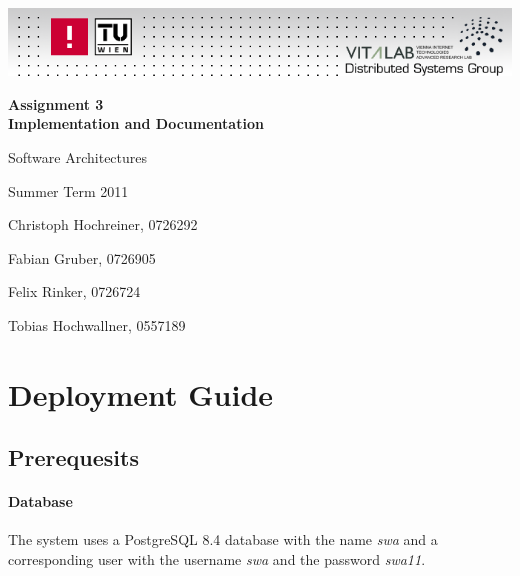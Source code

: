 \documentclass[a4paper]{article}
\begin{document}
\pagestyle{fancy}
\fancyfoot{}
\fancyhead{}
\fancyfoot[C]{\thepage}
\renewcommand{\headrulewidth}{0.0pt}

\begin{center}
\includegraphics[width=1.0\textwidth]{logo.png}

\vspace{3cm}

\huge \textsf{\textbf{Assignment 3\\Implementation and Documentation}}

\vspace{1ex}

\Large \rm{Software Architectures}

\vspace{1ex}

\Large \rm{Summer Term 2011}

\vspace{1ex}

\normalsize Christoph Hochreiner, 0726292

\normalsize Fabian Gruber, 0726905

\normalsize Felix Rinker, 0726724

\normalsize Tobias Hochwallner, 0557189

\end{center}
\pagebreak


\tableofcontents


\pagebreak

\section{Deployment Guide}

\subsection{Prerequesits}

\paragraph{Database}
The system uses a PostgreSQL 8.4 database with the name \emph{swa} and a corresponding user with the username \emph{swa} and the password \emph{swa11}.
\end{document}
